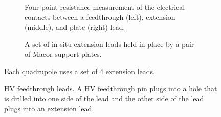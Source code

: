 \begin{figure}[]
	\centering
	\begin{subfigure}{\columnwidth}
		\caption{Four-point resistance measurement of the electrical contacts between a feedthrough (left), extension (middle), and plate (right) lead.}\label{fig:r_test_leads}
	\end{subfigure}
	\begin{subfigure}{\columnwidth}
		\caption{A set of in situ extension leads held in place by a pair of Macor support plates.}\label{fig:in_situ_extension_leads}
	\end{subfigure}
	\caption{Each quadrupole uses a set of 4 extension leads.}\label{fig:extension_leads}
\end{figure}

\begin{figure}[]
	\centering
	\caption{HV feedthrough leads. A HV feedthrough pin plugs into a hole that is drilled into one side of the lead and the other side of the lead plugs into an extension lead.}\label{fig:hv_feed_leads}
\end{figure}

